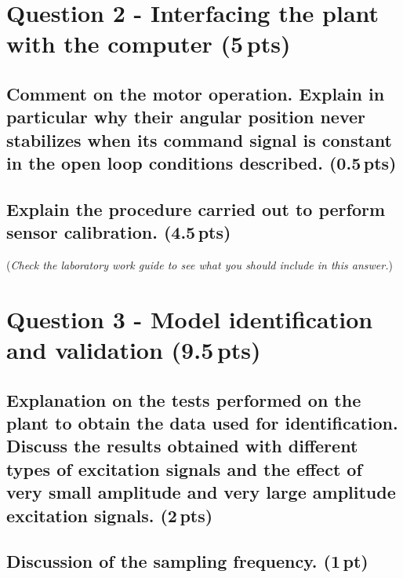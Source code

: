 \documentclass[a4paper,12pt]{article}
\begin{document}


\section{Question 2 - Interfacing the plant with the computer (5\,pts)}
\label{sec:q2}

\subsection{Comment on the motor operation. Explain in particular why their angular position never stabilizes when its command signal is constant in the open loop conditions described. (0.5\,pts)}
\vspace{10pt}


\subsection{Explain the procedure carried out to perform sensor calibration. (4.5\,pts)}
(\textit{Check the laboratory work guide to see what you should include in this answer.}) 
\vspace{15pt}


\section{Question 3 - Model identification and validation (9.5\,pts)}
\label{sec:q3}

\subsection{Explanation on the tests performed on the plant to obtain the data used for identification. Discuss the results obtained with different types of excitation signals and the effect of very small amplitude and very large amplitude excitation signals. (2\,pts)}
\vspace{10pt}


\subsection{Discussion of the sampling frequency. (1\,pt)}
\vspace{10pt}

\end{document}
